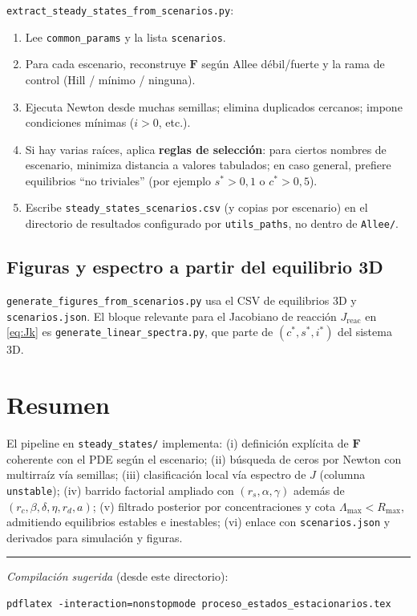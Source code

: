 \documentclass[11pt,a4paper]{article}
\begin{document}
\texttt{extract\_steady\_states\_from\_scenarios.py}:
\begin{enumerate}[leftmargin=*]
  \item Lee \texttt{common\_params} y la lista \texttt{scenarios}.
  \item Para cada escenario, reconstruye $\mathbf{F}$ según Allee débil/fuerte y la rama de control (Hill / mínimo / ninguna).
  \item Ejecuta Newton desde muchas semillas; elimina duplicados cercanos; impone condiciones mínimas ($i>0$, etc.).
  \item Si hay varias raíces, aplica \textbf{reglas de selección}: para ciertos nombres de escenario, minimiza distancia a valores tabulados; en caso general, prefiere equilibrios ``no triviales'' (por ejemplo $s^\ast>0{,}1$ o $c^\ast>0{,}5$).
  \item Escribe \texttt{steady\_states\_scenarios.csv} (y copias por escenario) en el directorio de resultados configurado por \texttt{utils\_paths}, no dentro de \texttt{Allee/}.
\end{enumerate}

\subsection{Figuras y espectro a partir del equilibrio 3D}

\texttt{generate\_figures\_from\_scenarios.py} usa el CSV de equilibrios 3D y \texttt{scenarios.json}. El bloque relevante para el Jacobiano de reacción $J_{\mathrm{reac}}$ en \eqref{eq:Jk} es \texttt{generate\_linear\_spectra.py}, que parte de $(c^\ast,s^\ast,i^\ast)$ del sistema 3D.

\section{Resumen}

El pipeline en \texttt{steady\_states/} implementa: (i) definición explícita de $\mathbf{F}$ coherente con el PDE según el escenario; (ii) búsqueda de ceros por Newton con multirraíz vía semillas; (iii) clasificación local vía espectro de $J$ (columna \texttt{unstable}); (iv) barrido factorial ampliado con $(r_s,\alpha,\gamma)$ además de $(r_c,\beta,\delta,\eta,r_d,a)$; (v) filtrado posterior por concentraciones y cota $\Lambda_{\max}<R_{\max}$, admitiendo equilibrios estables e inestables; (vi) enlace con \texttt{scenarios.json} y derivados para simulación y figuras.

\vspace{1em}
\noindent\rule{\textwidth}{0.4pt}

\noindent\textit{Compilación sugerida} (desde este directorio):
\begin{verbatim}
pdflatex -interaction=nonstopmode proceso_estados_estacionarios.tex
\end{verbatim}
\end{document}
